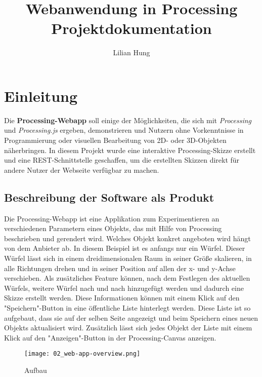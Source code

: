 \documentclass[12pt, ngerman, utf8]{article}
\begin{document}
\title{Webanwendung in Processing \\
		\large Projektdokumentation}
\author{Lilian Hung}

\maketitle

\newpage

\tableofcontents 

\lstlistoflistings

\newpage

\section{Einleitung}

Die \textbf{Processing-Webapp} soll einige der Möglichkeiten, die sich mit \emph{Processing} und \emph{Processing.js} ergeben, demonstrieren und Nutzern ohne Vorkenntnisse in Programmierung oder visuellen Bearbeitung von 2D- oder 3D-Objekten näherbringen.
In diesem Projekt wurde eine interaktive Processing-Skizze erstellt und eine REST-Schnittstelle geschaffen, um die erstellten Skizzen direkt für andere Nutzer der Webseite verfügbar zu machen.

\subsection{Beschreibung der Software als Produkt} 
Die Processing-Webapp ist eine Applikation zum Experimentieren an verschiedenen Parametern eines Objekts, das mit Hilfe von Processing beschrieben und gerendert wird. 
Welches Objekt konkret angeboten wird hängt von dem Anbieter ab. In diesem Beispiel ist es anfangs nur ein Würfel. Dieser Würfel lässt sich in einem dreidimensionalen Raum in seiner Größe skalieren, in alle Richtungen drehen und in seiner Position auf allen der x- und y-Achse verschieben. 
Als zusätzliches Feature können, nach dem Festlegen des aktuellen Würfels, weitere Würfel nach und nach hinzugefügt werden und dadurch eine Skizze erstellt werden.
Diese Informationen können mit einem Klick auf den "Speichern"-Button in eine öffentliche Liste hinterlegt werden. Diese Liste ist so aufgebaut, dass sie auf der selben Seite angezeigt und beim Speichern eines neuen Objekts aktualisiert wird. Zusätzlich lässt sich jedes Objekt der Liste mit einem Klick auf den "Anzeigen"-Button in der Processing-Canvas anzeigen.\\
\begin{figure}[p]
    \centering
    \texttt{[image: 02\_web-app-overview.png]}
    \caption{Aufbau}
\end{figure}
\end{document}
